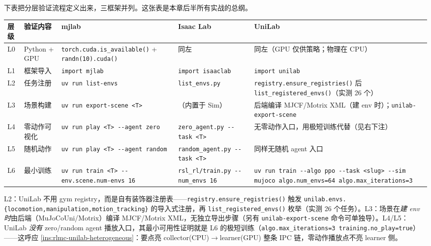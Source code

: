 下表把分层验证流程定义出来，三框架并列。这张表是本章后半所有实战的总纲。

\begin{center}
\scriptsize
\begin{tabular}{@{}p{0.5cm}p{1.7cm}p{3.0cm}p{3.0cm}p{3.6cm}@{}}
\toprule
层级 & 验证内容 & mjlab & Isaac Lab & UniLab \\
\midrule
L0 & Python + GPU & \verb|torch.cuda.is_available()| + \verb|randn(10).cuda()| & 同左 & 同左（GPU 仅供策略；物理在 CPU） \\
L1 & 框架导入 & \verb|import mjlab| & \verb|import isaaclab| & \verb|import unilab| \\
L2 & 任务注册 & \verb|uv run list-envs| & \verb|list_envs.py| & \verb|registry.ensure_registries()| 后 \verb|list_registered_envs()|（实测 26 个） \\
L3 & 场景构建 & \verb|uv run export-scene <T>| & （内置于 Sim） & 后端编译 MJCF/Motrix XML（建 env 时）；\verb|unilab-export-scene| \\
L4 & 零动作可视化 & \verb|uv run play <T> --agent zero| & \verb|zero_agent.py --task <T>| & 无零动作入口，用极短训练代替（见右下注） \\
L5 & 随机动作 & \verb|uv run play <T> --agent random| & \verb|random_agent.py --task <T>| & 同样无随机 agent 入口 \\
L6 & 最小训练 & \verb|uv run train <T> --env.scene.num-envs 16| & \verb|rsl_rl/train.py --num_envs 16| & \verb|uv run train --algo ppo --task <slug> --sim mujoco algo.num_envs=64 algo.max_iterations=3| \\
\bottomrule
\end{tabular}
\end{center}

\begin{note}
L2：UniLab 不用 gym registry，而是自有装饰器注册表——\verb|registry.ensure_registries()| 触发 \verb|unilab.envs.{locomotion,manipulation,motion_tracking}| 的导入式注册，再 \verb|list_registered_envs()| 枚举（实测 26 个任务）。L3：场景在\emph{建 env 时}由后端（MuJoCoUni/Motrix）编译 MJCF/Motrix XML，无独立导出步骤（另有 \verb|unilab-export-scene| 命令可单独导）。L4/L5：UniLab \emph{没有} zero/random agent 播放入口，其最小可用性证明就是 L6 的极短训练（\verb|algo.max_iterations=3 training.no_play=true|）——这呼应 \cref{ins:rlmc-unilab-heterogeneous}：要点亮 collector(CPU)$\to$learner(GPU) 整条 IPC 链，零动作播放点不亮 learner 侧。
\end{note}

